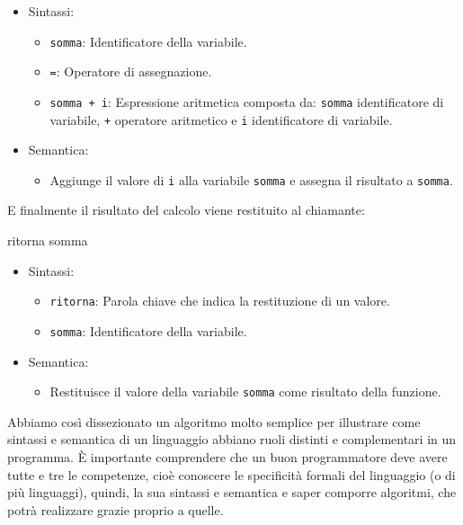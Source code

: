 \documentclass[
  letterpaper,
]{scrbook}
\newenvironment{Shaded}{\begin{snugshade}}{\end{snugshade}}
\newcommand{\NormalTok}[1]{\textcolor[rgb]{0.00,0.23,0.31}{#1}}
\providecommand{\tightlist}{%
  \setlength{\itemsep}{0pt}\setlength{\parskip}{0pt}}\usepackage{longtable,booktabs,array}
\begin{document}
\begin{itemize}
\tightlist
\item
  Sintassi:

  \begin{itemize}
  \tightlist
  \item
    \texttt{somma}: Identificatore della variabile.
  \item
    \texttt{=}: Operatore di assegnazione.
  \item
    \texttt{somma\ +\ i}: Espressione aritmetica composta da:
    \texttt{somma} identificatore di variabile, \texttt{+} operatore
    aritmetico e \texttt{i} identificatore di variabile.
  \end{itemize}
\item
  Semantica:

  \begin{itemize}
  \tightlist
  \item
    Aggiunge il valore di \texttt{i} alla variabile \texttt{somma} e
    assegna il risultato a \texttt{somma}.
  \end{itemize}
\end{itemize}

E finalmente il risultato del calcolo viene restituito al chiamante:

\begin{Shaded}
\begin{Highlighting}[]
\NormalTok{ritorna somma}
\end{Highlighting}
\end{Shaded}

\begin{itemize}
\tightlist
\item
  Sintassi:

  \begin{itemize}
  \tightlist
  \item
    \texttt{ritorna}: Parola chiave che indica la restituzione di un
    valore.
  \item
    \texttt{somma}: Identificatore della variabile.
  \end{itemize}
\item
  Semantica:

  \begin{itemize}
  \tightlist
  \item
    Restituisce il valore della variabile \texttt{somma} come risultato
    della funzione.
  \end{itemize}
\end{itemize}

Abbiamo così dissezionato un algoritmo molto semplice per illustrare
come sintassi e semantica di un linguaggio abbiano ruoli distinti e
complementari in un programma. È importante comprendere che un buon
programmatore deve avere tutte e tre le competenze, cioè conoscere le
specificità formali del linguaggio (o di più linguaggi), quindi, la sua
sintassi e semantica e saper comporre algoritmi, che potrà realizzare
grazie proprio a quelle.
\end{document}

